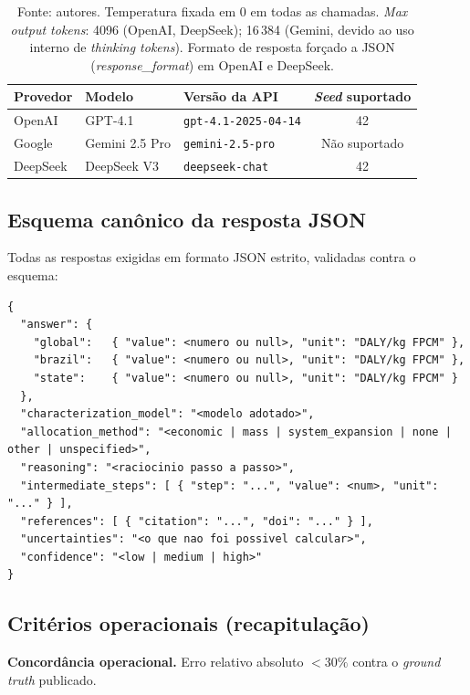 \documentclass[12pt,a4paper]{article}
\begin{document}
\begin{table}[h]
\centering
\small
\caption{Modelos LLM avaliados e parâmetros de chamada}
\label{tab:sm_models}
\begin{tabular}{lllc}
\toprule
\textbf{Provedor} & \textbf{Modelo} & \textbf{Versão da API} & \textbf{\emph{Seed} suportado} \\
\midrule
OpenAI    & GPT-4.1          & \texttt{gpt-4.1-2025-04-14} & 42 \\
Google    & Gemini 2.5 Pro   & \texttt{gemini-2.5-pro}     & Não suportado \\
DeepSeek  & DeepSeek V3      & \texttt{deepseek-chat}      & 42 \\
\bottomrule
\end{tabular}
\caption*{Fonte: autores. Temperatura fixada em 0 em todas as chamadas. \emph{Max output tokens}: 4096 (OpenAI, DeepSeek); 16\,384 (Gemini, devido ao uso interno de \emph{thinking tokens}). Formato de resposta forçado a JSON (\emph{response\_format}) em OpenAI e DeepSeek.}
\end{table}

\subsection{Esquema canônico da resposta JSON}

Todas as respostas exigidas em formato JSON estrito, validadas contra o esquema:

\begin{lstlisting}[style=prompt]
{
  "answer": {
    "global":   { "value": <numero ou null>, "unit": "DALY/kg FPCM" },
    "brazil":   { "value": <numero ou null>, "unit": "DALY/kg FPCM" },
    "state":    { "value": <numero ou null>, "unit": "DALY/kg FPCM" }
  },
  "characterization_model": "<modelo adotado>",
  "allocation_method": "<economic | mass | system_expansion | none | other | unspecified>",
  "reasoning": "<raciocinio passo a passo>",
  "intermediate_steps": [ { "step": "...", "value": <num>, "unit": "..." } ],
  "references": [ { "citation": "...", "doi": "..." } ],
  "uncertainties": "<o que nao foi possivel calcular>",
  "confidence": "<low | medium | high>"
}
\end{lstlisting}

\subsection{Critérios operacionais (recapitulação)}

\textbf{Concordância operacional.} Erro relativo absoluto $<30\%$ contra o \emph{ground truth} publicado.
\end{document}
